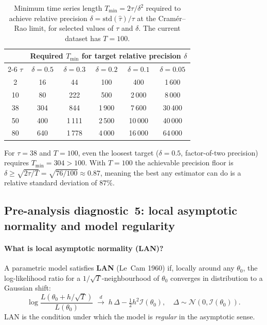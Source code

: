 \documentclass[11pt, a4paper]{article}
\begin{document}
\begin{table}[h]
\centering
\caption{Minimum time series length $T_{\min} = 2\tau/\delta^2$ required to
achieve relative precision $\delta = \mathrm{std}(\hat\tau)/\tau$ at the
Cram\'er--Rao limit, for selected values of $\tau$ and $\delta$.
The current dataset has $T = 100$.}
\label{tab:T_requirement}
\renewcommand{\arraystretch}{1.3}
\begin{tabular}{cccccc}
\hline
 & \multicolumn{5}{c}{Required $T_{\min}$ for target relative precision $\delta$} \\
\cmidrule(lr){2-6}
$\tau$ & $\delta=0.5$ & $\delta=0.3$ & $\delta=0.2$ & $\delta=0.1$ & $\delta=0.05$ \\
\hline
2   &  16  &  44  &  100 &  400  &  1\,600 \\
10  &  80  &  222 &  500 &  2\,000 & 8\,000 \\
38  &  304 &  844 & 1\,900 & 7\,600 & 30\,400 \\
50  &  400 & 1\,111 & 2\,500 & 10\,000 & 40\,000 \\
80  &  640 & 1\,778 & 4\,000 & 16\,000 & 64\,000 \\
\hline
\end{tabular}
\end{table}

\noindent For $\tau=38$ and $T=100$, even the loosest target ($\delta=0.5$,
factor-of-two precision) requires $T_{\min} = 304 > 100$.
With $T=100$ the achievable precision floor is
$\delta \geq \sqrt{2\tau/T} = \sqrt{76/100} \approx 0.87$,
meaning the best any estimator can do is a relative standard deviation of $87\%$.

\subsection*{Pre-analysis diagnostic~5: local asymptotic normality and model
regularity}
\label{sec:lan}

\paragraph{What is local asymptotic normality (LAN)?}
A parametric model satisfies \textbf{LAN} (Le~Cam 1960) if, locally around any
$\theta_0$, the log-likelihood ratio for a $1/\sqrt{T}$-neighbourhood of
$\theta_0$ converges in distribution to a Gaussian shift:
\begin{equation}
    \log \frac{L(\theta_0 + h/\sqrt{T})}{L(\theta_0)}
    \;\xrightarrow{d}\;
    h\,\Delta - \tfrac{1}{2}h^2 \mathcal{I}(\theta_0),
    \quad \Delta \sim \mathcal{N}(0, \mathcal{I}(\theta_0)).
\end{equation}
LAN is the condition under which the model is \emph{regular} in the asymptotic
sense.
\end{document}
